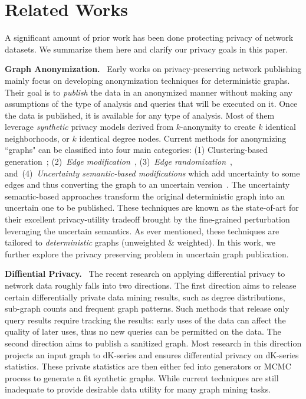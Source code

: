 \section{Related Works}
A significant amount of prior work has been done protecting privacy of network datasets.
We summarize them here and clarify our privacy goals in this paper. 

\textbf{Graph Anonymization.}~ Early works on privacy-preserving network publishing mainly focus on developing anonymization techniques for deterministic graphs. Their goal is to \emph{publish} the data in an anonymized manner without making any assumptions of the type of analysis and queries that will be executed on it. Once the data is published, it is available for any type of analysis. 
Most of them leverage \emph{synthetic} privacy models derived from $k$-anonymity to create $k$ identical neighborhoods, or $k$ identical degree nodes. Current methods for anonymizing ``graphs" can be classified into four main categories: (1) Clustering-based generation~\cite{Hay_Anonymizing_2007,Bhagat_Class_2009,hay2010resisting}; (2)~{\em Edge modification}~\cite{Liu_Towards_2008, Zhou_Preserving_2008, Wang2011, Wu_k_2010, Skarkala_Privacy_2012}, 
(3)~{\em Edge randomization}~\cite{Liu_Privacy_2009,Ying_Randomizing_2008, Ninggal_Utility_2015},
and~(4)~{\em Uncertainty semantic-based modifications} which add uncertainty to some edges and thus converting the graph to an uncertain version~\cite{Boldi_Injecting_2012, Nguyen_Anonymizing_2015}. 
The uncertainty semantic-based approaches transform the original deterministic graph into an uncertain one to be published. These techniques are known as the state-of-art for their excellent privacy-utility tradeoff brought by the fine-grained perturbation leveraging the uncertain semantics. As ever mentioned, these techniques are tailored to \emph{deterministic} graphs (unweighted \& weighted). In this work, we further explore the privacy preserving problem in uncertain graph publication. 

\textbf{Diffiential Privacy.}~ The recent research on applying differential privacy to network data roughly falls into two directions. The first direction aims to release certain differentially private data mining results, such as degree distributions, sub-graph counts and frequent graph patterns. Such methods that release only query results require tracking the results: early uses of the data can affect the quality of later uses, thus no new queries can be permitted on the data.  
The second direction aims to publish a sanitized graph. Most research in this direction projects an input graph to dK-series and ensures differential privacy on dK-series statistics. These private statistics are then either fed into generators or MCMC process to generate a fit synthetic graphs. While current techniques are still inadequate to provide desirable data utility for many graph mining tasks. 

